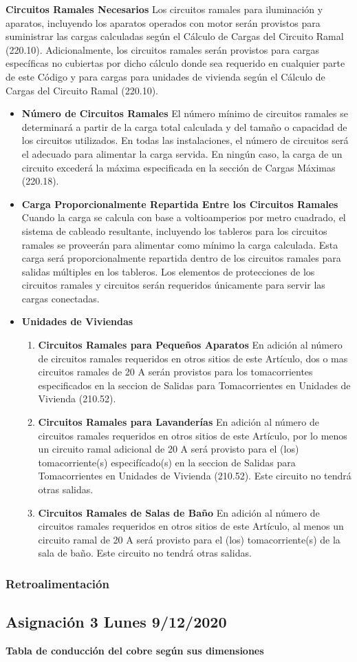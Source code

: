 \documentclass[11pt,letterpaper]{article}
\begin{document}
\newpage
\textbf{Circuitos Ramales Necesarios} Los circuitos ramales para iluminación y aparatos, incluyendo los aparatos operados con motor serán provistos para suministrar las cargas calculadas según el Cálculo de Cargas del Circuito Ramal (220.10). Adicionalmente, los circuitos ramales serán provistos para cargas específicas no cubiertas por dicho cálculo donde sea requerido en cualquier parte de este Código y para cargas para unidades de vivienda según el Cálculo de Cargas del Circuito Ramal (220.10).
\begin{itemize}
	\item \textbf{Número de Circuitos Ramales} El número mínimo de circuitos ramales se determinará a partir de la carga total calculada y del tamaño o capacidad de los circuitos utilizados. En todas las instalaciones, el número de circuitos será el adecuado para alimentar la carga servida. En ningún caso, la carga de un circuito excederá la máxima especificada en la sección de Cargas Máximas (220.18).

	\item \textbf{Carga Proporcionalmente Repartida Entre los Circui­tos Ramales} Cuando la carga se calcula con base a voltioamperios por metro cuadrado, el sistema de cableado resultante, incluyendo los tableros para los circuitos ramales se proveerán para alimentar como mínimo la carga calculada. Esta carga será proporcionalmente repartida dentro de los circuitos ramales para salidas múltiples en los tableros. Los elementos de protecciones de los circuitos ramales y circuitos serán requeridos únicamente para servir las cargas conectadas.

	\item \textbf{Unidades de Viviendas}
		\begin{enumerate}
			\item \textbf{Circuitos Ramales para Pequeños Aparatos} En adición al número de circuitos ramales requeridos en otros sitios de este Artículo, dos o mas circuitos ramales de 20 A serán provistos para los tomacorrientes especificados en la seccion de Salidas para Tomacorrientes en Unidades de Vivienda (210.52).
			\item \textbf{Circuitos Ramales para Lavanderías} En adición al número de circuitos ramales requeridos en otros sitios de este Artículo, por lo menos un circuito ramal adicional de 20 A será provisto para el (los) tomacorriente(s) especifícado(s) en la seccion de Salidas para Tomacorrientes en Unidades de Vivienda (210.52). Este circuito no tendrá otras salidas.
			\item \textbf{Circuitos Ramales de Salas de Baño} En adición al número de circuitos ramales requeridos en otros sitios de este Artículo, al menos un circuito ramal de 20 A será provisto para el (los) tomacorriente(s) de la sala de baño. Este circuito no tendrá otras salidas.
		\end{enumerate}
\end{itemize}
\subsubsection{Retroalimentación}
\subsection{Asignación 3 Lunes 9/12/2020}
\textbf{Tabla de conducción del cobre según sus dimensiones}\\

 
\end{document}

